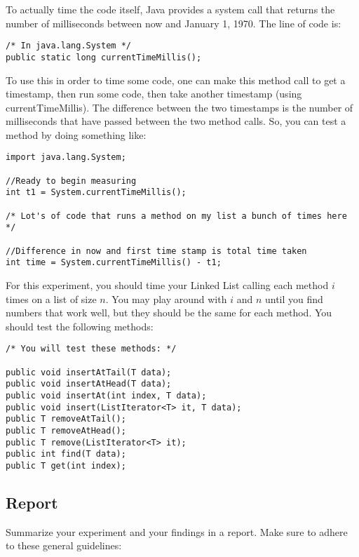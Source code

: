 \documentclass[paper=a4, fontsize=11pt, parskip=full]{scrartcl} %
\numberwithin{equation}{section} %
\numberwithin{figure}{section} %
\numberwithin{table}{section} %
\begin{document}
To actually time the code itself, Java provides a system call that returns the number of milliseconds between now and January 1, 1970. The line of code is:

\begin{lstlisting}
/* In java.lang.System */
public static long currentTimeMillis();
\end{lstlisting}

To use this in order to time some code, one can make this method call to get a timestamp, then run some code, then take another timestamp (using currentTimeMillis). The difference between the two timestamps is the number of milliseconds that have passed between the two method calls. So, you can test a method by doing something like:

\begin{lstlisting}
import java.lang.System;

//Ready to begin measuring
int t1 = System.currentTimeMillis();

/* Lot's of code that runs a method on my list a bunch of times here */

//Difference in now and first time stamp is total time taken
int time = System.currentTimeMillis() - t1;
\end{lstlisting}

For this experiment, you should time your Linked List calling each method $i$ times on a list of size $n$. You may play around with $i$ and $n$ until you find numbers that work well, but they should be the same for each method. You should test the following methods:

\begin{lstlisting}
/* You will test these methods: */

public void insertAtTail(T data);
public void insertAtHead(T data);
public void insertAt(int index, T data);
public void insert(ListIterator<T> it, T data);
public T removeAtTail();
public T removeAtHead();
public T remove(ListIterator<T> it);
public int find(T data);
public T get(int index);
\end{lstlisting}

\subsection{Report}

Summarize your experiment and your findings in a report. Make sure to adhere to these general guidelines:
\end{document}
